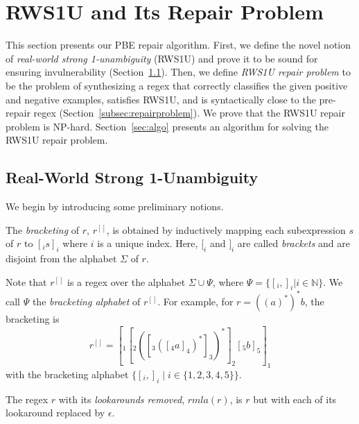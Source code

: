 \documentclass[conference]{IEEEtran}
\newcommand{\Bracketing}{\Psi}
\newcommand{\ltp}{RWS1U}
\newcommand{\removela}{\textit{rmla}}
\begin{document}
 
\section{\ltp{} and Its Repair Problem}
\label{sec:problem}



This section presents our PBE repair algorithm.  First, we define the novel notion of {\em real-world strong 1-unambiguity} (\ltp{}) and prove it to be sound for ensuring invulnerability (Section~\ref{subsec:lineartime}).  Then, we define {\em \ltp{} repair problem} to be the problem of synthesizing a regex that correctly classifies the given positive and negative examples, satisfies \ltp{}, and is syntactically close to the pre-repair regex (Section~\ref{subsec:repairproblem}).  We prove that the \ltp{} repair problem is NP-hard.  Section~\ref{sec:algo} presents an algorithm for solving the \ltp{} repair problem.

\subsection{Real-World Strong 1-Unambiguity}
\label{subsec:lineartime}
We begin by introducing some preliminary notions.
\begin{definition}[Bracketing]
\normalfont
The {\it bracketing} of $r$, $r^{[]}$, is obtained by inductively mapping each subexpression $s$ of $r$ to $[_i s ]_i$ where $i$ is a unique index.  Here, $[_i$ and $]_i$ are called {\em brackets} and are disjoint from the alphabet $\Sigma$ of $r$.
\end{definition}
Note that $r^{[]}$ is a regex over the alphabet $\Sigma \cup \Bracketing$, where $\Bracketing = \{ [_i, ]_i | i \in \mathbb{N}\}$.  We call $\Bracketing$ the {\em bracketing alphabet} of $r^{[]}$.
For example, for $r = ((a)^*)^*b$, the bracketing is 
\[
r^{[]} = [_1 [_2 ( [_3 ( [_4 a ]_4 )^* ]_3 )^* ]_2 [_5 b ]_5 ]_1
\]
with the bracketing alphabet $\{ [_i, ]_i \mid i \in \{ 1,2,3,4,5 \} \}$. 
\begin{definition}
\label{def:removela}
\normalfont
The regex $r$ with its {\em lookarounds removed}, $\removela(r)$, is $r$ but with each of its lookaround replaced by $\epsilon$. 
\end{definition}
\end{document}
